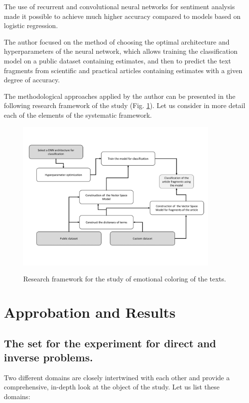 \documentclass[12pt]{report}
\theoremstyle{definition}
\begin{document}
The use of recurrent and convolutional neural networks for sentiment analysis made it possible to achieve much higher accuracy compared to models based on logistic regression.

The author focused on the method of choosing the optimal architecture and hyperparameters of the neural network, which allows training the classification model on a public dataset containing estimates, and then to predict the text fragments from scientific and practical articles containing estimates with a given degree of accuracy.

The methodological approaches applied by the author can be presented in the following research framework of the study (Fig. \ref{fig:op4_1}). 
Let us consider in more detail each of the elements of the systematic framework.

\begin{figure}[ht]
	\centering
	\includegraphics[width=0.9\textwidth]{op4_1eng}
	\label{fig:op4_1}
	\caption{Research framework for the study of emotional coloring of the texts.}
\end{figure}  

\chapter {Approbation and Results}
\section {The set for the experiment for direct and inverse problems.}

Two different domains are closely intertwined with each other and provide a comprehensive, in-depth look at the object of the study. 
Let us list these domains:
\end{document}
